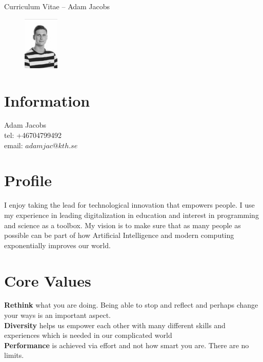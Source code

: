 \documentclass[margin,line,a4paper]{resume}
\begin{document}
{\sc \Large Curriculum Vitae -- Adam Jacobs}
\begin{resume}
    \vspace{0.01cm}
    \begin{figure}
        \vspace{-1cm}
       \begin{center}
       \includegraphics[width=0.15\textwidth]{adamjacobs}
       \end{center}
        \vspace{-1cm}
    \end{figure}
    
    \section{\mysidestyle Information}%
    Adam Jacobs \\
    tel: +46704799492 \\
    email: $adamjac@kth.se$
    \href{} \\

\section{\mysidestyle Profile}\vspace{1mm}
I enjoy taking the lead for technological innovation that empowers people. I use my experience in leading digitalization in education and interest in programming and science as a toolbox. My vision is to make sure that as many people as possible can be part of how Artificial Intelligence and modern computing exponentially improves our world.

\section{\mysidestyle Core Values}\vspace{1mm}
    \textbf{Rethink} what you are doing. Being able to stop and reflect and perhaps change your ways is an important aspect.
    \\
     \textbf{Diversity} helps us empower each other with many different skills and experiences which is needed in our complicated world
    \\
    \textbf{Performance} is achieved via effort and not how smart you are. There are no limits.


\end{resume}
\end{document}
